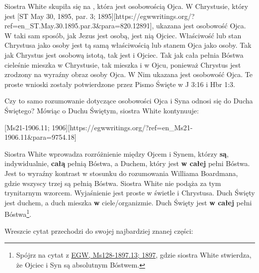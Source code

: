 Siostra White skupiła się na , która jest osobowością Ojca. W Chrystusie, który jest [ST May 30, 1895, par. 3; 1895][https://egwwritings.org/?ref=en\_ST.May.30.1895.par.3&para=820.12891], ukazana jest osobowość Ojca. W taki sam sposób, jak Jezus jest osobą, jest nią Ojciec. Właściwość lub stan Chrystusa jako osoby jest tą samą właściwością lub stanem Ojca jako osoby. Tak jak Chrystus jest osobową istotą, tak jest i Ojciec. Tak jak cała pełnia Bóstwa cieleśnie mieszka w Chrystusie, tak mieszka i w Ojcu, ponieważ Chrystus jest zrodzony na wyraźny obraz osoby Ojca. W Nim ukazana jest osobowość Ojca. Te proste wnioski zostały potwierdzone przez Pismo Święte w J 3:16 i Hbr 1:3.

Czy to samo rozumowanie dotyczące osobowości Ojca i Syna odnosi się do Ducha Świętego? Mówiąc o Duchu Świętym, siostra White kontynuuje:

[Ms21-1906.11; 1906][https://egwwritings.org/?ref=en\_Ms21-1906.11&para=9754.18]

Siostra White wprowadza rozróżnienie między Ojcem i Synem, którzy \textbf{są}, indywidualnie, \textbf{całą} pełnią Bóstwa, a Duchem, który jest \textbf{w całej} pełni Bóstwa. Jest to wyraźny kontrast w stosunku do rozumowania Williama Boardmana, gdzie wszyscy trzej są pełnią Bóstwa. Siostra White nie podąża za tym trynitarnym wzorcem. Wyjaśnienie jest proste w świetle  i Chrystusa. Duch Święty jest duchem, a duch mieszka \textbf{w} ciele/organizmie. Duch Święty jest \textbf{w całej} pełni Bóstwa\footnote{Spójrz na cytat z \href{https://egwwritings.org/?ref=en_Ms128-1897.13&para=5426.19}{{EGW, Ms128-1897.13; 1897}}, gdzie siostra White stwierdza, że Ojciec i Syn są absolutnym Bóstwem.}.

Wreszcie cytat przechodzi do swojej najbardziej znanej części:

